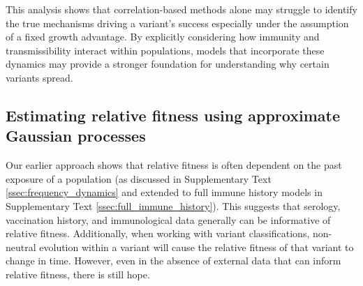 \documentclass[11pt,oneside,letterpaper]{article}
\begin{document}

This analysis shows that correlation-based methods alone may struggle to identify the true mechanisms driving a variant’s success especially under the assumption of a fixed growth advantage.
By explicitly considering how immunity and transmissibility interact within populations, models that incorporate these dynamics may provide a stronger foundation for understanding why certain variants spread.


\subsection*{Estimating relative fitness using approximate Gaussian processes}

Our earlier approach shows that relative fitness is often dependent on the past exposure of a population (as discussed in Supplementary Text \ref{ssec:frequency_dynamics} and extended to full immune history models in Supplementary Text \ref{ssec:full_immune_history}).
This suggests that serology, vaccination history, and immunological data generally can be informative of relative fitness.
Additionally, when working with variant classifications, non-neutral evolution within a variant will cause the relative fitness of that variant to change in time.
However, even in the absence of external data that can inform relative fitness, there is still hope.
\end{document}
